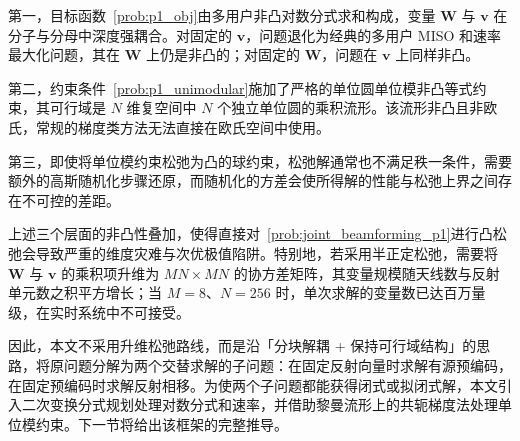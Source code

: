 第一，目标函数~\eqref{prob:p1_obj}由多用户非凸对数分式求和构成，变量 $\bm{W}$ 与 $\bm{v}$ 在分子与分母中深度强耦合。对固定的 $\bm{v}$，问题退化为经典的多用户 MISO 和速率最大化问题，其在 $\bm{W}$ 上仍是非凸的；对固定的 $\bm{W}$，问题在 $\bm{v}$ 上同样非凸。

第二，约束条件~\eqref{prob:p1_unimodular}施加了严格的单位圆单位模非凸等式约束，其可行域是 $N$ 维复空间中 $N$ 个独立单位圆的乘积流形。该流形非凸且非欧氏，常规的梯度类方法无法直接在欧氏空间中使用。

第三，即使将单位模约束松弛为凸的球约束，松弛解通常也不满足秩一条件，需要额外的高斯随机化步骤还原，而随机化的方差会使所得解的性能与松弛上界之间存在不可控的差距。

上述三个层面的非凸性叠加，使得直接对~\eqref{prob:joint_beamforming_p1}进行凸松弛会导致严重的维度灾难与次优极值陷阱。特别地，若采用半正定松弛，需要将 $\bm{W}$ 与 $\bm{v}$ 的乘积项升维为 $MN \times MN$ 的协方差矩阵，其变量规模随天线数与反射单元数之积平方增长；当 $M=8$、$N=256$ 时，单次求解的变量数已达百万量级，在实时系统中不可接受。

因此，本文不采用升维松弛路线，而是沿「分块解耦 + 保持可行域结构」的思路，将原问题分解为两个交替求解的子问题：在固定反射向量时求解有源预编码，在固定预编码时求解反射相移。为使两个子问题都能获得闭式或拟闭式解，本文引入二次变换分式规划处理对数分式和速率，并借助黎曼流形上的共轭梯度法处理单位模约束。下一节将给出该框架的完整推导。
